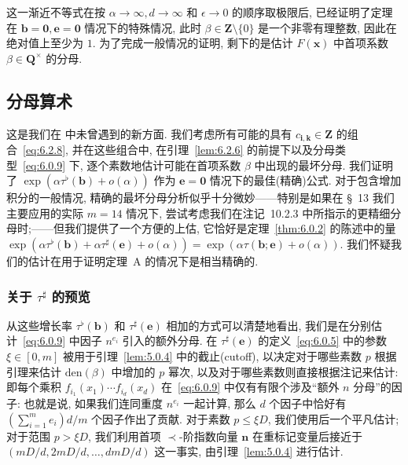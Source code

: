 这一渐近不等式在按 $\alpha \to \infty, d \to \infty$ 和 $\epsilon \to 0$ 的顺序取极限后, 已经证明了定理在 $\mathbf{b} = \mathbf{0}, \mathbf{e} = \mathbf{0}$ 情况下的特殊情况, 此时 $\beta \in \mathbf{Z} \setminus \{0\}$ 是一个非零有理整数, 因此在绝对值上至少为 $1$.
为了完成一般情况的证明, 剩下的是估计 $F(\mathbf{x})$ 中首项系数 $\beta \in \mathbf{Q}^{\times}$ 的分母.

\subsection{分母算术}\label{sec:6.6}

这是我们在 \cite[§ 2]{CDT21} 中未曾遇到的新方面.
我们考虑所有可能的具有 $c_{\mathbf{i},\mathbf{k}} \in \mathbf{Z}$ 的组合~\eqref{eq:6.2.8}, 并在这些组合中, 在引理~\ref{lem:6.2.6} 的前提下以及分母类型~\eqref{eq:6.0.9} 下, 逐个素数地估计可能在首项系数 $\beta$ 中出现的最坏分母.
我们证明了 $\exp\left(\alpha\tau^{\flat}(\mathbf{b}) + o(\alpha)\right)$ 作为 $\mathbf{e} = \mathbf{0}$ 情况下的最佳(精确)公式.
对于包含增加积分的一般情况, 精确的最坏分母分析似乎十分微妙——特别是如果在 \S~13 我们主要应用的实际 $m = 14$ 情况下, 尝试考虑我们在注记~10.2.3 中所指示的更精细分母时;——但我们提供了一个方便的上估, 它恰好是定理~\ref{thm:6.0.2} 的陈述中的量 $\exp\left(\alpha\tau^{\flat}(\mathbf{b}) + \alpha\tau^{\sharp}(\mathbf{e}) + o(\alpha)\right) = \exp\left(\alpha\tau(\mathbf{b}; \mathbf{e}) + o(\alpha)\right)$.
我们怀疑我们的估计在用于证明定理~A 的情况下是相当精确的.

\subsubsection{关于 $\tau^{\sharp}$ 的预览}\label{sec:6.6.1}

从这些增长率 $\tau^{\flat}(\mathbf{b})$ 和 $\tau^{\sharp}(\mathbf{e})$ 相加的方式可以清楚地看出, 我们是在分别估计~\eqref{eq:6.0.9} 中因子 $n^{e_i}$ 引入的额外分母.
在 $\tau^{\sharp}(\mathbf{e})$ 的定义~\eqref{eq:6.0.5} 中的参数 $\xi \in [0, m]$ 被用于引理~\ref{lem:5.0.4} 中的截止(cutoff), 以决定对于哪些素数 $p$ 根据引理来估计 $\mathrm{den}(\beta)$ 中增加的 $p$ 幂次, 以及对于哪些素数则直接根据注记来估计: 即每个乘积 $f_{i_1}(x_1) \cdots f_{i_d}(x_d)$ 在~\eqref{eq:6.0.9} 中仅有有限个涉及``额外 $n$ 分母''的因子: 也就是说, 如果我们连同重度 $n^{e_i}$ 一起计算, 那么 $d$ 个因子中恰好有 $(\sum_{i=1}^m e_i) d/m$ 个因子作出了贡献.
对于素数 $p \leq \xi D$, 我们使用后一个平凡估计; 对于范围 $p > \xi D$, 我们利用首项 $\prec$-阶指数向量 $\mathbf{n}$ 在重标记变量后接近于 $(mD/d, 2mD/d, \dots, dmD/d)$ 这一事实, 由引理~\ref{lem:5.0.4} 进行估计.

